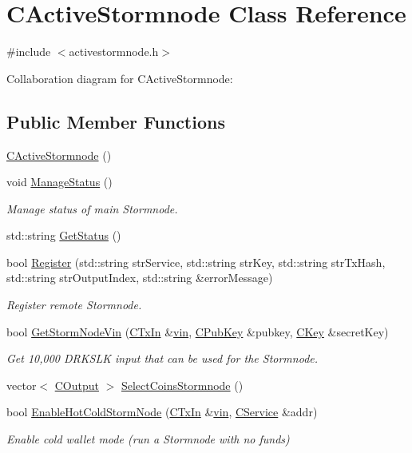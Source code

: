 \hypertarget{class_c_active_stormnode}{}\section{C\+Active\+Stormnode Class Reference}
\label{class_c_active_stormnode}


{\ttfamily \#include $<$activestormnode.\+h$>$}



Collaboration diagram for C\+Active\+Stormnode\+:
\subsection*{Public Member Functions}
\begin{DoxyCompactItemize}
\item 
\hyperlink{class_c_active_stormnode_a9bc5169371b86150c909ecc8105b738d}{C\+Active\+Stormnode} ()
\item 
void \hyperlink{class_c_active_stormnode_a9532e0804ea4c96ad7d58ab3e9da6891}{Manage\+Status} ()
\begin{DoxyCompactList}\small\item\em Manage status of main Stormnode. \end{DoxyCompactList}\item 
std\+::string \hyperlink{class_c_active_stormnode_ad52331446d221f1369870dbc6d92eaa7}{Get\+Status} ()
\item 
bool \hyperlink{class_c_active_stormnode_a23b6459a057d50230f258050e9b2d6f8}{Register} (std\+::string str\+Service, std\+::string str\+Key, std\+::string str\+Tx\+Hash, std\+::string str\+Output\+Index, std\+::string \&error\+Message)
\begin{DoxyCompactList}\small\item\em Register remote Stormnode. \end{DoxyCompactList}\item 
bool \hyperlink{class_c_active_stormnode_ab0e9106269959f9a396fbf914565e326}{Get\+Storm\+Node\+Vin} (\hyperlink{class_c_tx_in}{C\+Tx\+In} \&\hyperlink{class_c_active_stormnode_aef2103b9e7fdc173e56dbb8f903e1f38}{vin}, \hyperlink{class_c_pub_key}{C\+Pub\+Key} \&pubkey, \hyperlink{class_c_key}{C\+Key} \&secret\+Key)
\begin{DoxyCompactList}\small\item\em Get 10,000 D\+R\+K\+S\+L\+K input that can be used for the Stormnode. \end{DoxyCompactList}\item 
vector$<$ \hyperlink{class_c_output}{C\+Output} $>$ \hyperlink{class_c_active_stormnode_af66060dcef7137a1db78ad72b396d741}{Select\+Coins\+Stormnode} ()
\item 
bool \hyperlink{class_c_active_stormnode_af3925fdbe649c730b215b466680c0139}{Enable\+Hot\+Cold\+Storm\+Node} (\hyperlink{class_c_tx_in}{C\+Tx\+In} \&\hyperlink{class_c_active_stormnode_aef2103b9e7fdc173e56dbb8f903e1f38}{vin}, \hyperlink{class_c_service}{C\+Service} \&addr)
\begin{DoxyCompactList}\small\item\em Enable cold wallet mode (run a Stormnode with no funds) \end{DoxyCompactList}\end{DoxyCompactItemize}

